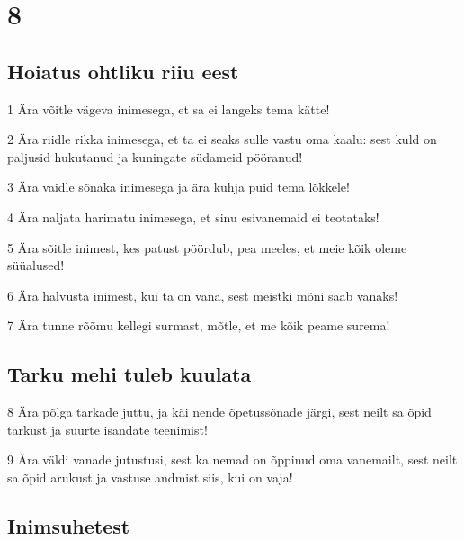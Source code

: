 \chapter{8}

\section*{Hoiatus ohtliku riiu eest}

\par 1 Ära võitle vägeva inimesega, et sa ei langeks tema kätte!
\par 2 Ära riidle rikka inimesega, et ta ei seaks sulle vastu oma kaalu: sest kuld on paljusid hukutanud ja kuningate südameid pööranud!
\par 3 Ära vaidle sõnaka inimesega ja ära kuhja puid tema lõkkele!
\par 4 Ära naljata harimatu inimesega, et sinu esivanemaid ei teotataks!
\par 5 Ära sõitle inimest, kes patust pöördub, pea meeles, et meie kõik oleme süüalused!
\par 6 Ära halvusta inimest, kui ta on vana, sest meistki mõni saab vanaks!
\par 7 Ära tunne rõõmu kellegi surmast, mõtle, et me kõik peame surema!

\section*{Tarku mehi tuleb kuulata}

\par 8 Ära põlga tarkade juttu, ja käi nende õpetussõnade järgi, sest neilt sa õpid tarkust ja suurte isandate teenimist!
\par 9 Ära väldi vanade jutustusi, sest ka nemad on õppinud oma vanemailt, sest neilt sa õpid arukust ja vastuse andmist siis, kui on vaja!

\section*{Inimsuhetest}

